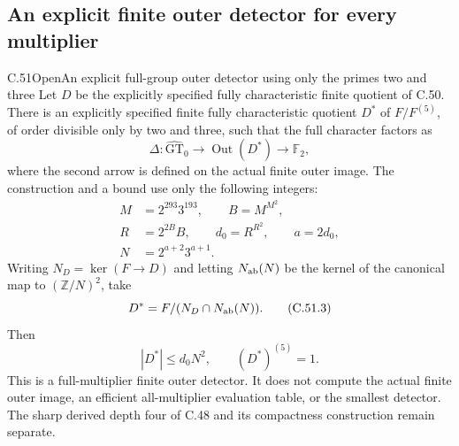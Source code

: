 \subsection{An explicit finite outer detector for every multiplier}

\begin{statement}{C.51}{Open}{An explicit full-group outer detector using only the primes two and three}
Let $D$ be the explicitly specified fully characteristic finite quotient
of C.50. There is an explicitly specified finite fully characteristic
quotient $D^*$ of $F/F^{(5)}$, of order divisible only by two and three,
such that the full character factors as
\[
 \Delta:\widehat{\mathrm{GT}}_0
       \longrightarrow \operatorname{Out}(D^*)
       \longrightarrow \mathbb F_2,
                                                        \tag{C.51.1}
\]
where the second arrow is defined on the actual finite outer image.
The construction and a bound use only the following integers:
\[
 \begin{split}
 M&=2^{293}3^{193},\qquad B=M^{M^2},\\
 R&=2^{2B}B,\qquad d_0=R^{R^2},\qquad a=2d_0,\\
 N&=2^{a+2}3^{a+1}.
 \end{split}                                             \tag{C.51.2}
\]
Writing $N_D=\ker(F\to D)$ and letting $N_{\rm ab}(N)$ be the
kernel of the canonical map to $(\mathbb Z/N)^2$, take
\[
 D^*=F/(N_D\cap N_{\rm ab}(N)).
                                                        \tag{C.51.3}
\]
Then
\[
 |D^*|\le d_0N^2,\qquad (D^*)^{(5)}=1.
                                                        \tag{C.51.4}
\]
This is a full-multiplier finite outer detector. It does not compute
the actual finite outer image, an efficient all-multiplier evaluation
table, or the smallest detector. The sharp derived depth four of
C.48 and its compactness construction remain separate.
\end{statement}


